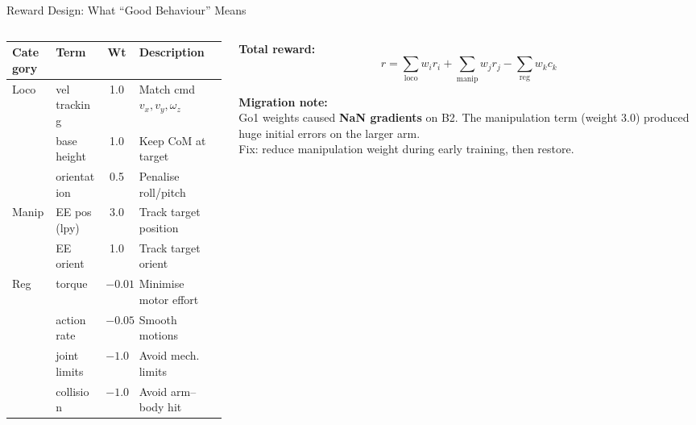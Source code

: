 \documentclass[10pt,aspectratio=169]{beamer}
\begin{document}
\begin{frame}{Reward Design: What ``Good Behaviour'' Means}
  \scriptsize
  \begin{columns}[T]
    \begin{column}{0.55\textwidth}
      \begin{table}
        \centering
        \renewcommand{\arraystretch}{1.15}
        \begin{tabular}{l l c p{3.5cm}}
          \toprule
          \textbf{Category} & \textbf{Term} & \textbf{Wt} & \textbf{Description} \\
          \midrule
          \multirow{3}{*}{Loco}
            & vel tracking  & 1.0 & Match cmd $v_x, v_y, \omega_z$ \\
            & base height   & 1.0 & Keep CoM at target \\
            & orientation   & 0.5 & Penalise roll/pitch \\
          \midrule
          \multirow{2}{*}{Manip}
            & EE pos (lpy)  & 3.0 & Track target position \\
            & EE orient     & 1.0 & Track target orient \\
          \midrule
          \multirow{4}{*}{Reg}
            & torque        & $-0.01$ & Minimise motor effort \\
            & action rate   & $-0.05$ & Smooth motions \\
            & joint limits  & $-1.0$  & Avoid mech. limits \\
            & collision     & $-1.0$  & Avoid arm--body hit \\
          \bottomrule
        \end{tabular}
      \end{table}
    \end{column}
    \begin{column}{0.43\textwidth}
      \vspace{6pt}
      \textbf{Total reward:}
      \[
        r = \!\!\sum_{\text{loco}} w_i r_i
          + \!\!\sum_{\text{manip}} w_j r_j
          - \!\!\sum_{\text{reg}} w_k c_k
      \]

      \vspace{6pt}
      \textbf{Migration note:}\\
      Go1 weights caused \textbf{NaN gradients} on B2.
      The manipulation term (weight 3.0) produced huge
      initial errors on the larger arm.\\[3pt]
      Fix: reduce manipulation weight during early
      training, then restore.
    \end{column}
  \end{columns}
\end{frame}
\end{document}
